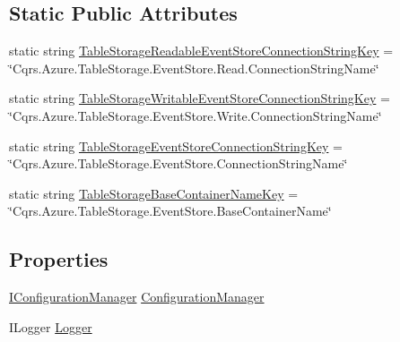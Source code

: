 \subsection*{Static Public Attributes}
\begin{DoxyCompactItemize}
\item 
static string \hyperlink{classCqrs_1_1Azure_1_1BlobStorage_1_1Events_1_1TableStorageEventStoreConnectionStringFactory_ac28aea2439fe0bed85d1b53c0fd8fdaf_ac28aea2439fe0bed85d1b53c0fd8fdaf}{Table\+Storage\+Readable\+Event\+Store\+Connection\+String\+Key} = \char`\"{}Cqrs.\+Azure.\+Table\+Storage.\+Event\+Store.\+Read.\+Connection\+String\+Name\char`\"{}
\item 
static string \hyperlink{classCqrs_1_1Azure_1_1BlobStorage_1_1Events_1_1TableStorageEventStoreConnectionStringFactory_a73df7618d5978a2c0d2e69880b799369_a73df7618d5978a2c0d2e69880b799369}{Table\+Storage\+Writable\+Event\+Store\+Connection\+String\+Key} = \char`\"{}Cqrs.\+Azure.\+Table\+Storage.\+Event\+Store.\+Write.\+Connection\+String\+Name\char`\"{}
\item 
static string \hyperlink{classCqrs_1_1Azure_1_1BlobStorage_1_1Events_1_1TableStorageEventStoreConnectionStringFactory_a95f8662029c8a40117e326973de936bf_a95f8662029c8a40117e326973de936bf}{Table\+Storage\+Event\+Store\+Connection\+String\+Key} = \char`\"{}Cqrs.\+Azure.\+Table\+Storage.\+Event\+Store.\+Connection\+String\+Name\char`\"{}
\item 
static string \hyperlink{classCqrs_1_1Azure_1_1BlobStorage_1_1Events_1_1TableStorageEventStoreConnectionStringFactory_a9aad5e7497e3f5192d3aaec8d5f7b5f8_a9aad5e7497e3f5192d3aaec8d5f7b5f8}{Table\+Storage\+Base\+Container\+Name\+Key} = \char`\"{}Cqrs.\+Azure.\+Table\+Storage.\+Event\+Store.\+Base\+Container\+Name\char`\"{}
\end{DoxyCompactItemize}
\subsection*{Properties}
\begin{DoxyCompactItemize}
\item 
\hyperlink{interfaceCqrs_1_1Configuration_1_1IConfigurationManager}{I\+Configuration\+Manager} \hyperlink{classCqrs_1_1Azure_1_1BlobStorage_1_1Events_1_1TableStorageEventStoreConnectionStringFactory_a3787d14bf40a1756c742b0640413a62e_a3787d14bf40a1756c742b0640413a62e}{Configuration\+Manager}
\item 
I\+Logger \hyperlink{classCqrs_1_1Azure_1_1BlobStorage_1_1Events_1_1TableStorageEventStoreConnectionStringFactory_a1324be985c77f1393a45a73dbb178314_a1324be985c77f1393a45a73dbb178314}{Logger}
\end{DoxyCompactItemize}


